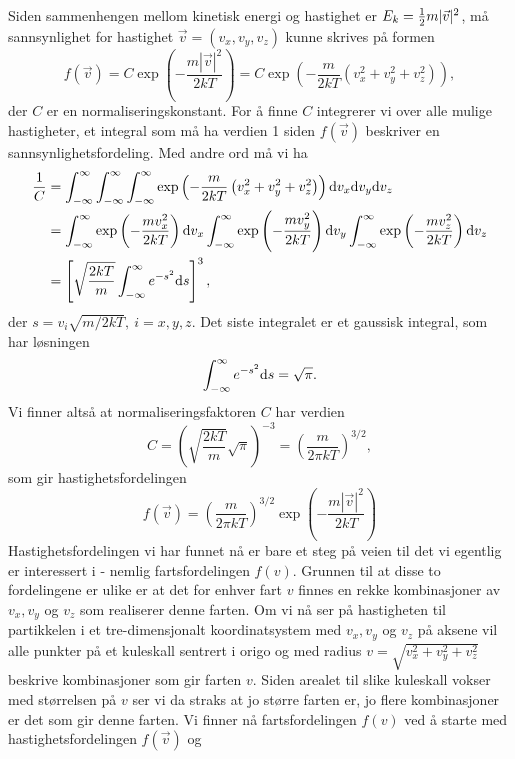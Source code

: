 Siden sammenhengen mellom kinetisk energi og hastighet er $E_k = \frac{1}{2} m|\vec{v}|^2$, må sannsynlighet for hastighet $\vec{v} = (v_x,v_y,v_z)$ kunne skrives på formen
\begin{displaymath}
	f(\vec{v}) = C\exp\left(-\frac{m|\vec{v}|^2}{2kT}\right) = C\exp\left(-\frac{m}{2kT}\left(v_x^2+v_y^2+v_z^2\right)\right),
\end{displaymath}
der $C$ er en normaliseringskonstant. For å finne $C$ integrerer vi over alle mulige hastigheter, et integral som må ha verdien 1 siden $f(\vec{v})$ beskriver en sannsynlighetsfordeling. Med andre ord må vi ha
\begin{displaymath}
\begin{aligned}
	\frac{1}{C} &= \int_{-\infty}^{\infty}\int_{-\infty}^{\infty}\int_{-\infty}^{\infty}\exp\left(-\frac{m}{2kT}\left(v_x^2+v_y^2+v_z^2\right)\right)\text{d} v_x \text{d} v_y \text{d} v_z \\
	&= \int_{-\infty}^{\infty}\exp\left(-\frac{mv_x^2}{2kT}\right)\text{d} v_x  \int_{-\infty}^{\infty}\exp\left(-\frac{mv_y^2}{2kT}\right)\text{d} v_y  \int_{-\infty}^{\infty}\exp\left(-\frac{mv_z^2}{2kT}\right)\text{d} v_z \\
	&= \left[ \sqrt{\frac{2kT}{m}}\int_{-\infty}^\infty e^{-s^2} \text{d} s\right]^3, 
\end{aligned}
\end{displaymath}
der $s = v_i\sqrt{m/2kT},~i = {x,y,z}$. Det siste integralet er et gaussisk integral, som har løsningen
\begin{displaymath}
	\int_{-\infty}^\infty e^{-s^2} \text{d} s  = \sqrt{\pi}.
\end{displaymath}
Vi finner altså at normaliseringsfaktoren $C$ har verdien
\begin{displaymath}
	C =  \left(\sqrt{\frac{2kT}{m}}\sqrt{\pi}\right)^{-3} = \left(\frac{m}{2\pi kT}\right)^{3/2},
\end{displaymath}
som gir hastighetsfordelingen
\begin{displaymath}
	f(\vec{v}) = \left(\frac{m}{2\pi kT}\right)^{3/2}\exp\left(-\frac{m|\vec{v}|^2}{2kT}\right) 
\end{displaymath}
Hastighetsfordelingen vi har funnet nå er bare et steg på veien til det vi egentlig er interessert i - nemlig fartsfordelingen $f(v)$. Grunnen til at disse to fordelingene er ulike er at det for enhver fart $v$ finnes en rekke kombinasjoner av $v_x, v_y$ og $v_z$ som realiserer denne farten. Om vi nå ser på hastigheten til partikkelen i et tre-dimensjonalt koordinatsystem med $v_x, v_y$ og $v_z$ på aksene vil alle punkter på et kuleskall sentrert i origo og med radius $v = \sqrt{v_x^2+v_y^2 + v_z^2}$ beskrive kombinasjoner som gir farten $v$. Siden arealet til slike kuleskall vokser med størrelsen på $v$ ser vi da straks at jo større farten er, jo flere kombinasjoner er det som gir denne farten. Vi finner nå fartsfordelingen $f(v)$ ved å starte med hastighetsfordelingen $f(\vec{v})$ og
